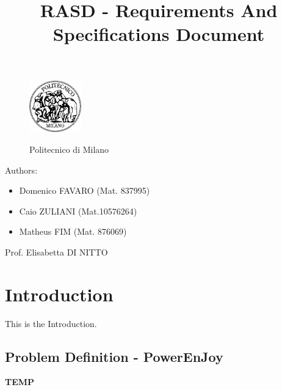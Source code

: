 \documentclass[a4paper]{article}
\title{RASD - Requirements And Specifications Document}
\begin{document}
\begin{titlepage}
\begin{figure}
\centering
\includegraphics[width=0.2\textwidth]{polimi.jpg}
\par
\LARGE Politecnico di Milano
\end{figure}


\maketitle
\raggedright
Authors:
\begin{itemize}
	\item Domenico FAVARO (Mat. 837995)
	\item Caio ZULIANI (Mat.10576264)
	\item Matheus FIM (Mat. 876069)
\end{itemize}
\raggedleft
Prof. Elisabetta DI NITTO
\thispagestyle{empty}
\end{titlepage}

\tableofcontents
\newpage
 
\section{Introduction}
 
This is the Introduction.
\subsection{Problem Definition - PowerEnJoy}

\textbf{TEMP}
\end{document}
